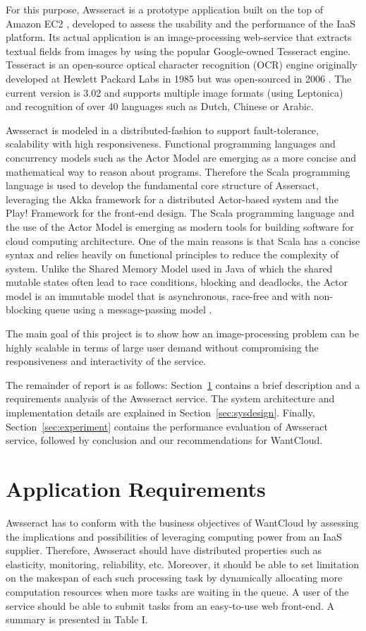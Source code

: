 \documentclass[conference]{IEEEtran}
\begin{document}
For this purpose, Awsseract is a prototype application built on the top of Amazon EC2 \cite{amazon}, developed to assess the usability and the performance of the IaaS platform. Its actual application is an image-processing web-service that extracts textual fields from images by using the popular Google-owned Tesseract engine. Tesseract is an open-source optical character recognition (OCR) engine originally developed at Hewlett Packard Labs in 1985 but was open-sourced in 2006 \cite{tess}.  The current version is 3.02 and supports multiple image formats (using Leptonica) and recognition of over 40 languages such as Dutch, Chinese or Arabic.

Awsseract is modeled in a distributed-fashion to support fault-tolerance, scalability with high responsiveness. Functional programming languages and concurrency models such as the Actor Model are emerging as a more concise and mathematical way to reason about programs. Therefore the Scala programming language is used to develop the fundamental core structure of Assersact, leveraging the Akka framework for a distributed Actor-based system and the Play! Framework for the front-end design.  The Scala programming language and the use of the Actor Model is emerging as modern tools for building software for cloud computing architecture. One of the main reasons is that Scala has a concise syntax and relies heavily on functional principles to reduce the complexity of system. Unlike the Shared Memory Model used in Java of which the shared mutable states often lead to race conditions, blocking and deadlocks, the Actor model is an immutable model that is asynchronous, race-free and with non-blocking queue using a message-passing model \cite{akka}.
        
The main goal of this project is to show how an image-processing problem can be highly scalable in terms of large user demand without compromising the responsiveness and interactivity of the service. 

The remainder of report is as follows: Section~\ref{sec:bg} contains a brief description and a requirements analysis of the Awsseract service. The system architecture and implementation details are explained in Section~\ref{sec:sysdesign}. Finally, Section~\ref{sec:experiment} contains the performance evaluation of Awsseract service, followed by conclusion and our recommendations for WantCloud. 

\section{Application Requirements}\label{sec:bg}
\noindent
Awsseract has to conform with the business objectives of WantCloud by assessing the implications and possibilities of leveraging computing power from an IaaS supplier. Therefore, Awsseract should have distributed properties such as elasticity, monitoring, reliability, etc. Moreover, it should be able to set limitation on the makespan of each such processing task by dynamically allocating more computation resources when more tasks are waiting in the queue. A user of the service should be able to submit tasks from an easy-to-use web front-end. A summary is presented in Table I.
\end{document}
